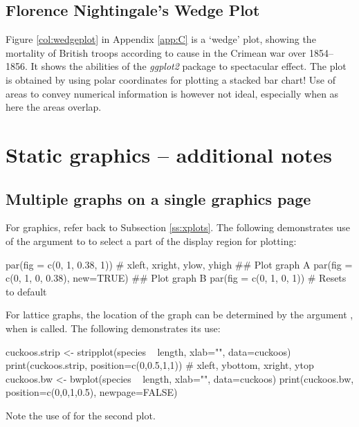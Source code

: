 \subsection*{Florence Nightingale's Wedge Plot}

Figure \ref{col:wedgeplot} in Appendix \ref{app:C} is a `wedge'
plot, showing the mortality of British troops according to cause in
the Crimean war over 1854--1856. It shows the abilities of the {\em
  ggplot2} package to spectacular effect.  The plot is obtained by
using polar coordinates for plotting a stacked bar chart!  Use of
areas to convey numerical information is however not ideal, especially
when as here the areas overlap.


\section{Static graphics -- additional notes}
\subsection{Multiple graphs on a single graphics page}\label{ssec:xgph}

For  graphics, refer back to Subsection \ref{ss:xplots}.
The following demonstrates use of the 
argument to  to select a part of the display region
for plotting:
\begin{Schunk}
\begin{Sinput}
par(fig = c(0, 1, 0.38, 1))
          # xleft, xright, ylow, yhigh
## Plot graph A
par(fig = c(0, 1, 0, 0.38), new=TRUE)
## Plot graph B
par(fig = c(0, 1, 0, 1))     # Resets to default
\end{Sinput}
\end{Schunk}
For lattice graphs, the location of the graph can be determined
by the argument , when  is called.
The following demonstrates its use:
\begin{fullwidth}
\begin{Schunk}
\begin{Sinput}
cuckoos.strip <- stripplot(species ~ length, xlab="", data=cuckoos)
print(cuckoos.strip, position=c(0,0.5,1,1))
                   # xleft, ybottom, xright, ytop
cuckoos.bw <- bwplot(species ~ length, xlab="", data=cuckoos)
print(cuckoos.bw, position=c(0,0,1,0.5), newpage=FALSE)
\end{Sinput}
\end{Schunk}
\end{fullwidth}
\noindent
Note the use of  for the second plot.

